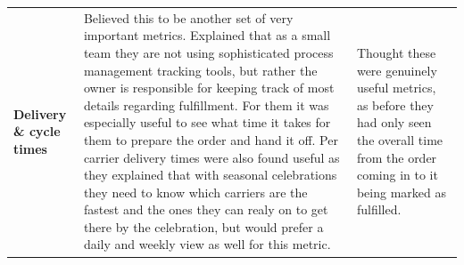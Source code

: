 \documentclass{imc-inf}
\begin{document}
\begin{longtable}{@{}>{\raggedright\arraybackslash}p{3cm}p{5.75cm}p{5.75cm}@{}}
  \textbf{Delivery \& cycle times}                                                                                                                                                                                                                                                                                                                                                                                                                                                                                                                                                                                                                                                                                                                                                                                                                                                                             &
  Believed this to be another set of very important metrics. Explained that as a small team they are not using sophisticated process management tracking tools, but rather the owner is responsible for keeping track of most details regarding fulfillment. For them it was especially useful to see what time it takes for them to prepare the order and hand it off. Per carrier delivery times were also found useful as they explained that with seasonal celebrations they need to know which carriers are the fastest and the ones they can realy on to get there by the celebration, but would prefer a daily and weekly view as well for this metric.                                                                                                                                                                                                                                                 &
  Thought these were genuinely useful metrics, as before they had only seen the overall time from the order coming in to it being marked as fulfilled.                                                                                                                                                                                                                                                                                                                                                                                                                                                                                                                                                                                                                                                                                                                                                                                                     \\[6pt]


\end{longtable}
\end{document}
